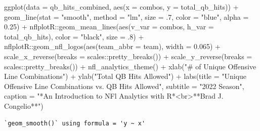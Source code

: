 \documentclass[
  letterpaper,
]{krantz}
\newenvironment{Shaded}{\begin{snugshade}}{\end{snugshade}}
\newcommand{\AttributeTok}[1]{\textcolor[rgb]{0.40,0.45,0.13}{#1}}
\newcommand{\DecValTok}[1]{\textcolor[rgb]{0.68,0.00,0.00}{#1}}
\newcommand{\FloatTok}[1]{\textcolor[rgb]{0.68,0.00,0.00}{#1}}
\newcommand{\FunctionTok}[1]{\textcolor[rgb]{0.28,0.35,0.67}{#1}}
\newcommand{\NormalTok}[1]{\textcolor[rgb]{0.00,0.23,0.31}{#1}}
\newcommand{\SpecialCharTok}[1]{\textcolor[rgb]{0.37,0.37,0.37}{#1}}
\newcommand{\StringTok}[1]{\textcolor[rgb]{0.13,0.47,0.30}{#1}}
\begin{document}
\begin{Shaded}
\begin{Highlighting}[]
\FunctionTok{ggplot}\NormalTok{(}\AttributeTok{data =}\NormalTok{ qb\_hits\_combined, }\FunctionTok{aes}\NormalTok{(}\AttributeTok{x =}\NormalTok{ combos, }\AttributeTok{y =}\NormalTok{ total\_qb\_hits)) }\SpecialCharTok{+}
    \FunctionTok{geom\_line}\NormalTok{(}\AttributeTok{stat =} \StringTok{"smooth"}\NormalTok{, }\AttributeTok{method =} \StringTok{"lm"}\NormalTok{,}
              \AttributeTok{size =}\NormalTok{ .}\DecValTok{7}\NormalTok{, }\AttributeTok{color =} \StringTok{"blue"}\NormalTok{,}
              \AttributeTok{alpha =} \FloatTok{0.25}\NormalTok{) }\SpecialCharTok{+}
\NormalTok{  nflplotR}\SpecialCharTok{::}\FunctionTok{geom\_mean\_lines}\NormalTok{(}\FunctionTok{aes}\NormalTok{(}\AttributeTok{v\_var =}\NormalTok{ combos, }\AttributeTok{h\_var =}\NormalTok{ total\_qb\_hits),}
                            \AttributeTok{color =} \StringTok{"black"}\NormalTok{, }\AttributeTok{size =}\NormalTok{ .}\DecValTok{8}\NormalTok{) }\SpecialCharTok{+}
\NormalTok{  nflplotR}\SpecialCharTok{::}\FunctionTok{geom\_nfl\_logos}\NormalTok{(}\FunctionTok{aes}\NormalTok{(}\AttributeTok{team\_abbr =}\NormalTok{ team), }\AttributeTok{width =} \FloatTok{0.065}\NormalTok{) }\SpecialCharTok{+}
  \FunctionTok{scale\_x\_reverse}\NormalTok{(}\AttributeTok{breaks =}\NormalTok{ scales}\SpecialCharTok{::}\FunctionTok{pretty\_breaks}\NormalTok{()) }\SpecialCharTok{+}
  \FunctionTok{scale\_y\_reverse}\NormalTok{(}\AttributeTok{breaks =}\NormalTok{ scales}\SpecialCharTok{::}\FunctionTok{pretty\_breaks}\NormalTok{()) }\SpecialCharTok{+}
  \FunctionTok{nfl\_analytics\_theme}\NormalTok{() }\SpecialCharTok{+}
  \FunctionTok{xlab}\NormalTok{(}\StringTok{"\# of Unique Offensive Line Combinations"}\NormalTok{) }\SpecialCharTok{+}
  \FunctionTok{ylab}\NormalTok{(}\StringTok{"Total QB Hits Allowed"}\NormalTok{) }\SpecialCharTok{+}
  \FunctionTok{labs}\NormalTok{(}\AttributeTok{title =} \StringTok{"Unique Offensive Line Combinations vs. QB Hits Allowed"}\NormalTok{,}
       \AttributeTok{subtitle =} \StringTok{"2022 Season"}\NormalTok{,}
       \AttributeTok{caption =} \StringTok{"*An Introduction to NFl Analytics with R*\textless{}br\textgreater{}**Brad J. Congelio**"}\NormalTok{)}
\end{Highlighting}
\end{Shaded}

\begin{verbatim}
`geom_smooth()` using formula = 'y ~ x'
\end{verbatim}
\end{document}
